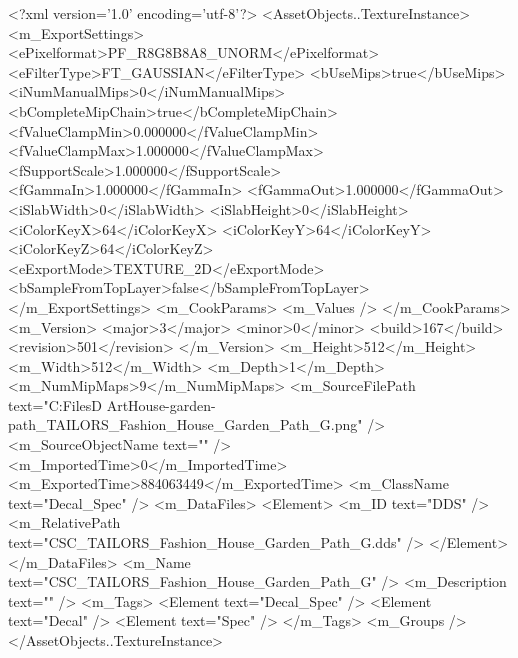 <?xml version='1.0' encoding='utf-8'?>
<AssetObjects..TextureInstance>
  <m_ExportSettings>
    <ePixelformat>PF_R8G8B8A8_UNORM</ePixelformat>
    <eFilterType>FT_GAUSSIAN</eFilterType>
    <bUseMips>true</bUseMips>
    <iNumManualMips>0</iNumManualMips>
    <bCompleteMipChain>true</bCompleteMipChain>
    <fValueClampMin>0.000000</fValueClampMin>
    <fValueClampMax>1.000000</fValueClampMax>
    <fSupportScale>1.000000</fSupportScale>
    <fGammaIn>1.000000</fGammaIn>
    <fGammaOut>1.000000</fGammaOut>
    <iSlabWidth>0</iSlabWidth>
    <iSlabHeight>0</iSlabHeight>
    <iColorKeyX>64</iColorKeyX>
    <iColorKeyY>64</iColorKeyY>
    <iColorKeyZ>64</iColorKeyZ>
    <eExportMode>TEXTURE_2D</eExportMode>
    <bSampleFromTopLayer>false</bSampleFromTopLayer>
  </m_ExportSettings>
  <m_CookParams>
    <m_Values />
  </m_CookParams>
  <m_Version>
    <major>3</major>
    <minor>0</minor>
    <build>167</build>
    <revision>501</revision>
  </m_Version>
  <m_Height>512</m_Height>
  <m_Width>512</m_Width>
  <m_Depth>1</m_Depth>
  <m_NumMipMaps>9</m_NumMipMaps>
  <m_SourceFilePath text="C:\Users\Shadow\Desktop\Working Files\3D Art\TAILORS\Fashion House-garden-path\textures\CSC_TAILORS_Fashion_House_Garden_Path_G.png" />
  <m_SourceObjectName text="" />
  <m_ImportedTime>0</m_ImportedTime>
  <m_ExportedTime>884063449</m_ExportedTime>
  <m_ClassName text="Decal_Spec" />
  <m_DataFiles>
    <Element>
      <m_ID text="DDS" />
      <m_RelativePath text="CSC_TAILORS_Fashion_House_Garden_Path_G.dds" />
    </Element>
  </m_DataFiles>
  <m_Name text="CSC_TAILORS_Fashion_House_Garden_Path_G" />
  <m_Description text="" />
  <m_Tags>
    <Element text="Decal_Spec" />
    <Element text="Decal" />
    <Element text="Spec" />
  </m_Tags>
  <m_Groups />
</AssetObjects..TextureInstance>